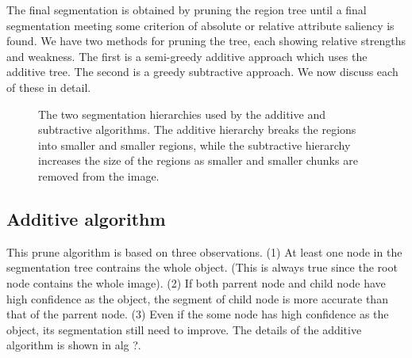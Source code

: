 \documentclass[10pt,twocolumn,letterpaper]{article}
\begin{document}
The final segmentation is obtained by pruning the region tree until a final segmentation
meeting some criterion of absolute or relative attribute saliency is found.
We have two methods for pruning the tree, each showing relative strengths and
weakness.  The first is a semi-greedy additive approach which uses the additive
tree.  The second is a greedy subtractive approach.  We now discuss each of these 
in detail.

\begin{figure}
\label{fig:tree}
\centering
{}
\caption{The two segmentation hierarchies used by the additive 
and subtractive  algorithms.  The additive hierarchy breaks the
regions into smaller and smaller regions, while the subtractive hierarchy increases
the size of the regions as smaller and smaller chunks are removed from the image.}
\end{figure}

\subsection{Additive algorithm}
\label{ssec:additive}

This prune algorithm is based on three observations. (1) At least one node in the segmentation tree contrains the whole object. (This is always true since the root node contains the whole image). (2) If both parrent node and child node have high confidence as the object, the segment of child node is more accurate than that of the parrent node. (3) Even if the some node has high confidence as the object, its segmentation still need to improve. The details of the additive algorithm is shown in alg ?.\\
\end{document}
